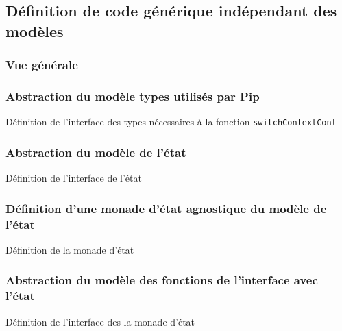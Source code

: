 		\subsection{Définition de code générique indépendant des modèles}

			\subsubsection{Vue générale}

			\subsubsection{Abstraction du modèle types utilisés par Pip}

			\begin{listing}[!ht]
				\caption{Définition de l'interface des types nécessaires à la fonction \texttt{switchContextCont}}
				\label{code:TypesParameter}
			\end{listing}

			\subsubsection{Abstraction du modèle de l'état}

			\begin{listing}[!ht]
				\caption{Définition de l'interface de l'état}
				\label{code:StateParameter}
			\end{listing}

			\subsubsection{Définition d'une monade d'état agnostique du modèle de l'état}

			\begin{listing}[!ht]
				\caption{Définition de la monade d'état}
				\label{code:StateAgnosticMonad}
			\end{listing}

			\subsubsection{Abstraction du modèle des fonctions de l'interface avec l'état}

			\begin{listing}[!ht]
				\caption{Définition de l'interface des la monade d'état}
				\label{code:InterfaceParameters}
			\end{listing}

